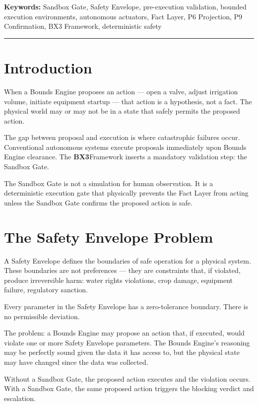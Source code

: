 \documentclass[12pt]{article}
\newcommand{\bxthree}{\textbf{BX3}}
\begin{document}
\vspace{0.5em}
\noindent\textbf{Keywords:} Sandbox Gate, Safety Envelope, pre-execution validation, bounded execution environments, autonomous actuators, Fact Layer, P6 Projection, P9 Confirmation, BX3 Framework, deterministic safety

\vspace{1em}
\hrule
\vspace{1em}

\section{Introduction}
\label{sec:intro}

When a Bounds Engine proposes an action --- open a valve, adjust irrigation volume, initiate equipment startup --- that action is a hypothesis, not a fact. The physical world may or may not be in a state that safely permits the proposed action.

The gap between proposal and execution is where catastrophic failures occur. Conventional autonomous systems execute proposals immediately upon Bounds Engine clearance. The \bxthree Framework inserts a mandatory validation step: the Sandbox Gate.

The Sandbox Gate is not a simulation for human observation. It is a deterministic execution gate that physically prevents the Fact Layer from acting unless the Sandbox Gate confirms the proposed action is safe.

\section{The Safety Envelope Problem}
\label{sec:problem}

A Safety Envelope defines the boundaries of safe operation for a physical system. These boundaries are not preferences --- they are constraints that, if violated, produce irreversible harm: water rights violations, crop damage, equipment failure, regulatory sanction.

Every parameter in the Safety Envelope has a zero-tolerance boundary. There is no permissible deviation.

The problem: a Bounds Engine may propose an action that, if executed, would violate one or more Safety Envelope parameters. The Bounds Engine's reasoning may be perfectly sound given the data it has access to, but the physical state may have changed since the data was collected.

Without a Sandbox Gate, the proposed action executes and the violation occurs. With a Sandbox Gate, the same proposed action triggers the blocking verdict and escalation.
\end{document}
